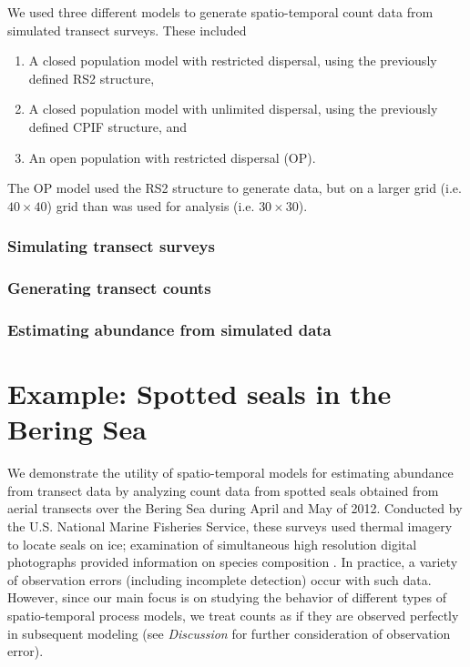 \documentclass[times,mee,doublespace,]{besauth2}
\begin{document}
We used three different models to generate spatio-temporal count data from simulated transect surveys.  These included
\begin{enumerate}
   \item  A closed population model with restricted dispersal, using the previously defined RS2 structure,
   \item A closed population model with unlimited dispersal, using the previously defined CPIF structure, and
   \item An open population with restricted dispersal (OP).
\end{enumerate}
The OP model used the RS2 structure to generate data, but on a larger grid (i.e. $40 \times 40$) grid than was used for analysis (i.e. $30 \times 30$).

\subsubsection{Simulating transect surveys}

\subsubsection{Generating transect counts}

\subsubsection{Estimating abundance from simulated data}


\section{Example: Spotted seals in the Bering Sea}

We demonstrate the utility of spatio-temporal models for estimating abundance from transect data by analyzing
count data from spotted seals obtained from aerial transects over the Bering Sea during April and May of 2012.  Conducted by the U.S. National Marine Fisheries Service, these surveys used thermal imagery to locate seals on ice; examination of simultaneous high resolution digital photographs provided information on species composition \citep[for detailed information on survey methods, see][]{ConnEtAl2014}.  In practice, a variety of observation errors (including incomplete detection) occur with such data.  However, since our main focus is on studying the behavior of different types of spatio-temporal process models, we treat counts as if they are observed perfectly in subsequent modeling (see {\it Discussion} for further consideration of observation error).
\end{document}
